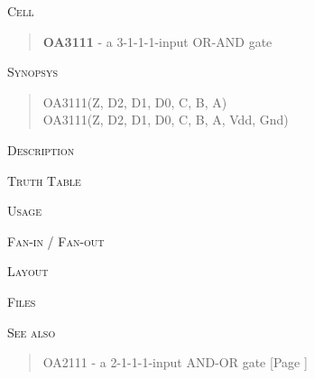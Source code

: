 
\label{OA3111}
\textsc{Cell}
\begin{quote}
    \textbf{OA3111} - a 3-1-1-1-input OR-AND gate
\end{quote}

\textsc{Synopsys}
\begin{quote}
    OA3111(Z, D2, D1, D0, C, B, A) \\
    OA3111(Z, D2, D1, D0, C, B, A, Vdd, Gnd)
\end{quote}

\textsc{Description}

%

\textsc{Truth Table}


\textsc{Usage}

\textsc{Fan-in / Fan-out}

\textsc{Layout}

\textsc{Files}

\textsc{See also}
\begin{quote}
    OA2111 - a 2-1-1-1-input AND-OR gate [Page \pageref{OA2111}]
\end{quote}
